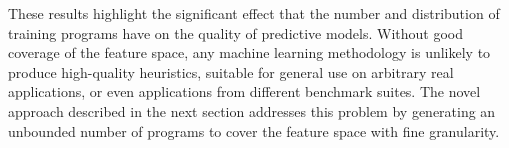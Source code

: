	These results highlight the significant effect that the number and distribution of training programs have on the quality of predictive models. Without good coverage of the feature space, any machine learning methodology is unlikely to produce high-quality heuristics, suitable for general use on arbitrary real applications, or even applications from different benchmark suites. The novel approach described in the next section addresses this problem by generating an unbounded number of programs to cover the feature space with fine granularity.

